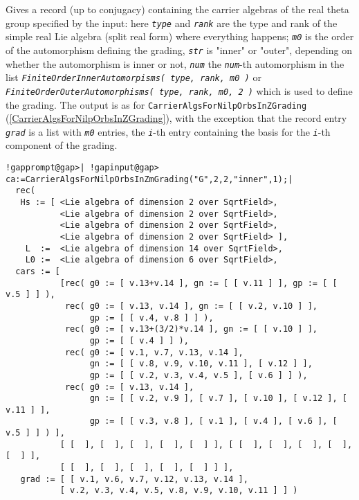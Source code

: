 \documentclass[a4paper,11pt]{report}
\begin{document}
{{{ Gives a record (up to conjugacy) containing the carrier algebras of the real
theta group specified by the input: here \mbox{\texttt{\mdseries\slshape type}} and \mbox{\texttt{\mdseries\slshape rank}} are the type and rank of the simple real Lie algebra (split real form) where
everything happens; \mbox{\texttt{\mdseries\slshape m0}} is the order of the automorphism defining the grading, \mbox{\texttt{\mdseries\slshape str}} is "inner" or "outer", depending on whether the automorphism is inner or not, \mbox{\texttt{\mdseries\slshape num}} the \mbox{\texttt{\mdseries\slshape num}}-th automorphism in the list \mbox{\texttt{\mdseries\slshape FiniteOrderInnerAutomorpisms( type, rank, m0 )}} or \mbox{\texttt{\mdseries\slshape FiniteOrderOuterAutomorphisms( type, rank, m0, 2 )}} which is used to define the grading. The output is as for \texttt{CarrierAlgsForNilpOrbsInZGrading} (\ref{CarrierAlgsForNilpOrbsInZGrading}), with the exception that the record entry \mbox{\texttt{\mdseries\slshape grad}} is a list with \mbox{\texttt{\mdseries\slshape m0}} entries, the \mbox{\texttt{\mdseries\slshape i}}-th entry containing the basis for the \mbox{\texttt{\mdseries\slshape i}}-th component of the grading. 
\begin{Verbatim}[commandchars=!@|,fontsize=\small,frame=single,label=Example]
  !gapprompt@gap>| !gapinput@gap> ca:=CarrierAlgsForNilpOrbsInZmGrading("G",2,2,"inner",1);|
  rec( 
   Hs := [ <Lie algebra of dimension 2 over SqrtField>, 
           <Lie algebra of dimension 2 over SqrtField>, 
           <Lie algebra of dimension 2 over SqrtField>, 
           <Lie algebra of dimension 2 over SqrtField> ], 
    L  :=  <Lie algebra of dimension 14 over SqrtField>, 
    L0 :=  <Lie algebra of dimension 6 over SqrtField>, 
  cars := [ 
           [rec( g0 := [ v.13+v.14 ], gn := [ [ v.11 ] ], gp := [ [ v.5 ] ] ), 
            rec( g0 := [ v.13, v.14 ], gn := [ [ v.2, v.10 ] ], 
                 gp := [ [ v.4, v.8 ] ] ), 
            rec( g0 := [ v.13+(3/2)*v.14 ], gn := [ [ v.10 ] ], 
                 gp := [ [ v.4 ] ] ), 
            rec( g0 := [ v.1, v.7, v.13, v.14 ], 
                 gn := [ [ v.8, v.9, v.10, v.11 ], [ v.12 ] ], 
                 gp := [ [ v.2, v.3, v.4, v.5 ], [ v.6 ] ] ), 
            rec( g0 := [ v.13, v.14 ], 
                 gn := [ [ v.2, v.9 ], [ v.7 ], [ v.10 ], [ v.12 ], [ v.11 ] ], 
                 gp := [ [ v.3, v.8 ], [ v.1 ], [ v.4 ], [ v.6 ], [ v.5 ] ] ) ], 
           [ [  ], [  ], [  ], [  ], [  ] ], [ [  ], [  ], [  ], [  ], [  ] ], 
           [ [  ], [  ], [  ], [  ], [  ] ] ], 
   grad := [ [ v.1, v.6, v.7, v.12, v.13, v.14 ], 
           [ v.2, v.3, v.4, v.5, v.8, v.9, v.10, v.11 ] ] )
  
\end{Verbatim}
 }

 }

 }
\end{document}
